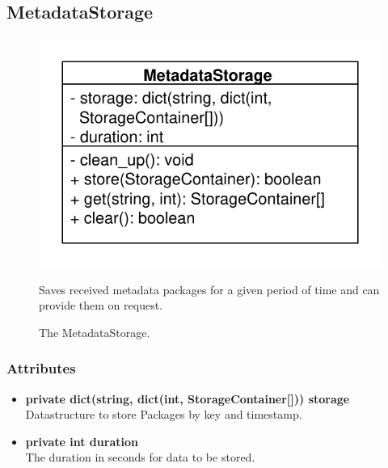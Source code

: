 \subsection{MetadataStorage}
\begin{figure}[htbp]
	\begin{minipage}[t]{7cm}
		\vspace{0pt}
		\centering
		\includegraphics[scale=0.6]{./diagram_pictures/MetadataStorage.pdf}
		\caption{The MetadataStorage.}
	\end{minipage}
	\hfill
	\begin{minipage}[t]{8cm}
		\vspace{10pt}
		Saves received metadata packages for a given period of time and can provide them on request.
	\end{minipage}
\end{figure}

\subsubsection{Attributes}
\begin{itemize}
	\item \textbf{private dict(string, dict(int, StorageContainer[])) storage}\\
	Datastructure to store Packages by key and timestamp.
	\item \textbf{private int duration}\\
	The duration in seconds for data to be stored.
\end{itemize}
